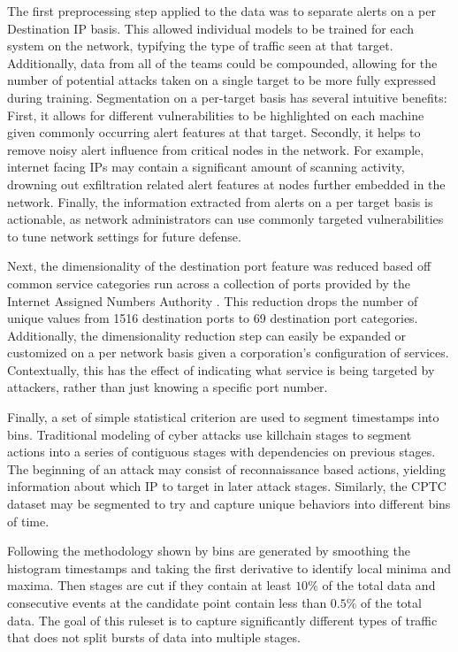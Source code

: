 The first preprocessing step applied to the data was to separate alerts on a per Destination IP basis. This allowed individual models to be trained for each system on the network, typifying the type of traffic seen at that target. Additionally, data from all of the teams could be compounded, allowing for the number of potential attacks taken on a single target to be more fully expressed during training. Segmentation on a per-target basis has several intuitive benefits: First, it allows for different vulnerabilities to be highlighted on each machine given commonly occurring alert features at that target. Secondly, it helps to remove noisy alert influence from critical nodes in the network. For example, internet facing IPs may contain a significant amount of scanning activity, drowning out exfiltration related alert features at nodes further embedded in the network. Finally, the information extracted from alerts on a per target basis is actionable, as network administrators can use commonly targeted vulnerabilities to tune network settings for future defense. 

Next, the dimensionality of the destination port feature was reduced based off common service categories run across a collection of ports provided by the Internet Assigned Numbers Authority \cite{iana}. This reduction drops the number of unique values from 1516 destination ports to 69 destination port categories. Additionally, the dimensionality reduction step can easily be expanded or customized on a per network basis given a corporation's configuration of services. Contextually, this has the effect of indicating what service is being targeted by attackers, rather than just knowing a specific port number. 

Finally, a set of simple statistical criterion are used to segment timestamps into bins. Traditional modeling of cyber attacks use killchain stages to segment actions into a series of contiguous stages with dependencies on previous stages. The beginning of an attack may consist of reconnaissance based actions, yielding information about which IP to target in later attack stages. Similarly, the CPTC dataset may be segmented to try and capture unique behaviors into different bins of time. 

Following the methodology shown by \cite{us} bins are generated by smoothing the histogram timestamps and taking the first derivative to identify local minima and maxima. Then stages are cut if they contain at least $10\%$ of the total data and consecutive events at the candidate point contain less than $0.5\%$ of the total data. The goal of this ruleset is to capture significantly different types of traffic that does not split bursts of data into multiple stages.

